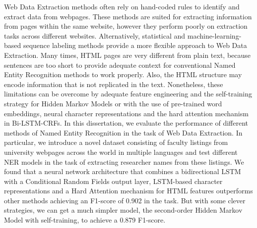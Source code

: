 Web Data Extraction methods often rely on hand-coded rules to 
identify and extract data from webpages. These methods are
suited for extracting information from pages within
the same website, however they perform poorly on extraction 
tasks across different websites. Alternatively, statistical and 
machine-learning-based sequence labeling methods provide a more flexible 
approach to Web Data Extraction. Many times, HTML pages are very different 
from plain text, because sentences are too short to provide adequate 
context for conventional Named Entity Recognition methods to work 
properly. Also, the HTML structure may encode information that is not 
replicated in the text. Nonetheless, these limitations can be overcome by
adequate feature engineering and the self-training strategy for Hidden
Markov Models or with the use of pre-trained word embeddings, neural character 
representations and the hard attention mechanism in Bi-LSTM-CRFs.
In this dissertation, we 
evaluate the performance of different methods of Named Entity Recognition 
in the task of Web Data Extraction. In particular, we introduce a novel 
dataset consisting of faculty listings from university webpages across
the world in multiple languages and test different NER models in the task of 
extracting researcher names from these listings. We found that a 
neural network architecture that combines a bidirectional LSTM with
a Conditional Random Fields output layer, LSTM-based character 
representations and a Hard Attention mechanism for HTML features
outperforms other methods achieving an F1-score of 0.902 in the task.
But with some clever strategies, we can get a much simpler model, the 
second-order Hidden Markov Model with self-training, to achieve a 0.879 
F1-score.


